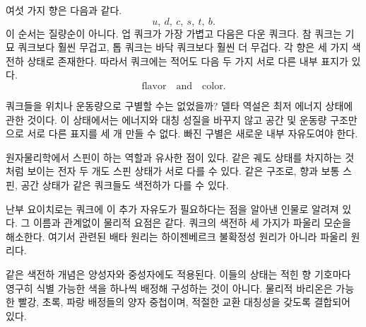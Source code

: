 여섯 가지 향은 다음과 같다.
\begin{equation}
u,\ d,\ c,\ s,\ t,\ b.
\end{equation}
이 순서는 질량순이 아니다. 업 쿼크가 가장 가볍고 다음은 다운 쿼크다. 참 쿼크는 기묘 쿼크보다 훨씬 무겁고, 톱 쿼크는 바닥 쿼크보다 훨씬 더 무겁다. 각 향은 세 가지 색전하 상태로 존재한다. 따라서 쿼크에는 적어도 다음 두 가지 서로 다른 내부 표지가 있다.
\begin{equation}
\text{flavor}\quad\text{and}\quad\text{color}.
\end{equation}

쿼크들을 위치나 운동량으로 구별할 수는 없었을까? 델타 역설은 최저 에너지 상태에 관한 것이다. 이 상태에서는 에너지와 대칭 성질을 바꾸지 않고 공간 및 운동량 구조만으로 서로 다른 표지를 세 개 만들 수 없다. 빠진 구별은 새로운 내부 자유도여야 한다.

원자물리학에서 스핀이 하는 역할과 유사한 점이 있다. 같은 궤도 상태를 차지하는 것처럼 보이는 전자 두 개도 스핀 상태가 서로 다를 수 있다. 같은 구조로, 향과 보통 스핀, 공간 상태가 같은 쿼크들도 색전하가 다를 수 있다.


난부 요이치로는 쿼크에 이 추가 자유도가 필요하다는 점을 알아낸 인물로 알려져 있다. 그 이름과 관계없이 물리적 요점은 같다. 쿼크의 색전하 세 가지가 파울리 모순을 해소한다. 여기서 관련된 배타 원리는 하이젠베르크 불확정성 원리가 아니라 파울리 원리다.


같은 색전하 개념은 양성자와 중성자에도 적용된다. 이들의 상태는 적힌 향 기호마다 영구히 식별 가능한 색을 하나씩 배정해 구성하는 것이 아니다. 물리적 바리온은 가능한 빨강, 초록, 파랑 배정들의 양자 중첩이며, 적절한 교환 대칭성을 갖도록 결합되어 있다.

\begin{classroomqa}
\end{classroomqa}

